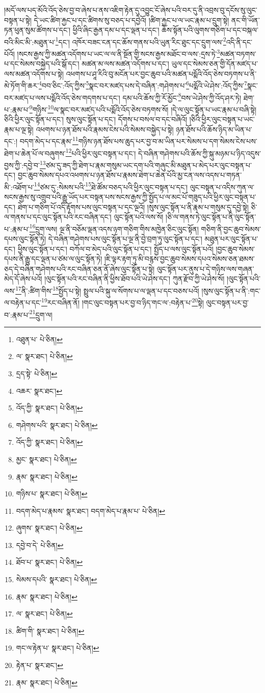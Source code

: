 །མདོ་ལས་པད་མོའི་འོད་ཅེས་བྱ་བ་ཞེས་པ་ནས་འཇིག་རྟེན་དུ་འབྱུང་ངོ་ཞེས་པའི་བར་དུ་ནི་འབྲས་བུ་དངོས་སུ་ལུང་བསྟན་པ་སྟེ། དེ་ཡང་ཚིག་རྐྱང་པ་དང་ཚིགས་སུ་བཅད་པ་དབྱེའོ། །ཚིག་རྐྱང་པ་ལ་ཡང་རྣམ་པ་དྲུག་སྟེ། ནང་གི་ཡོན་ཏན་ཕུན་སུམ་ཚོགས་པ་དང་། ཕྱིའི་ཞིང་རྒྱན་དམ་པ་དང་ལྡན་པ་དང་། ཆོས་སྟོན་པའི་ལུགས་གཅིག་པ་དང་བསྐལ་བའི་མིང་མི་:མཐུན་པ་\footnote{འཐུན་པ་  པེ་ཅིན། }དང་། འཁོར་བཟང་ངན་དང་ཆོས་གནས་པའི་ཡུན་རིང་ཐུང་དང་དྲུག་ལས་\footnote{ལ་  སྣར་ཐང་།  པེ་ཅིན། }འདི་ནི་དང་པོའོ། །སངས་རྒྱས་ཀྱི་མཚན་འདོགས་པ་ཡང་ལ་ལ་ནི་སྔོན་གྱི་སངས་རྒྱས་མཐོང་བ་ལས་:དྲས་ཏེ་\footnote{དྲད་སྟེ་  པེ་ཅིན། }མཚན་བཏགས་པ་དང་སེམས་བསྐྱེད་པའི་སྒོ་དང་། མཚན་མ་ལས་མཚན་འདོགས་པ་དང་། ཡུལ་དང་སེམས་ཅན་གྱི་དོན་མཛད་པ་ལས་མཚན་འདོགས་པ་སྟེ། འཕགས་པ་ཤཱ་རིའི་བུ་མངོན་པར་བྱང་ཆུབ་པའི་མཚན་པདྨོའི་འོད་ཅེས་བཏགས་པ་ནི་མེ་ཏོག་གི་ཆར་\footnote{འཆར་  སྣར་ཐང་། }བབ་ཅིང་:འོད་ཀྱིས་\footnote{འོད་ཀྱི་  སྣར་ཐང་།  པེ་ཅིན། }སྣང་བར་མཛད་པས་དེ་བཞིན་:གཤེགས་པ་\footnote{གཤེགས་པའི་  སྣར་ཐང་།  པེ་ཅིན། }པདྨོའི་ཡེ་ཤེས་:འོད་ཀྱིས་\footnote{འོད་ཀྱི་  སྣར་ཐང་།  པེ་ཅིན། }སྣང་བར་མཛད་པ་ལས་པདྨོའི་འོད་ཅེས་གདགས་པ་དང་། དམ་པའི་ཆོས་ཀྱི་རོ་མྱོང་\footnote{མྱང་  སྣར་ཐང་།  པེ་ཅིན། }བས་ཡེ་ཤེས་ཀྱི་འོད་ཤར་ཏེ། ཐེག་པ་:རྣམ་པ་\footnote{རྣམ་  སྣར་ཐང་།  པེ་ཅིན། }གཉིས་\footnote{གཉིས་པ་  སྣར་ཐང་།  པེ་ཅིན། }ལ་སྣང་བར་མཛད་པའི་པདྨོའི་འོད་ཅེས་བཏགས་སོ། །དེ་ལ་ལུང་སྟོན་པ་ཡང་རྣམ་པ་བཞི་སྟེ། ཅིའི་ཕྱིར་ལུང་སྟོན་པ་དང་། སུས་ལུང་སྟོན་པ་དང་། དོགས་པ་བསལ་བ་དང་བཞིའོ། །ཅིའི་ཕྱིར་ལུང་བསྟན་པ་ཡང་རྣམ་པ་ལྔ་སྟེ། འཕགས་པ་ཉན་ཐོས་པའི་རྣམས་ངེས་པའི་སེམས་བསྐྱེད་པ་སྟེ། ཉན་ཐོས་པའི་ཆོས་ཉིད་མ་ཡིན་པ་དང་:། བདག་མེད་པ་དང་རྣམ་\footnote{བདག་མེད་པ་རྣམས་  སྣར་ཐང་། བདག་མེད་པ་རྣམ་པ་  པེ་ཅིན། }གཉིས་ཉན་ཐོས་པས་ཆུད་པར་བྱ་བ་མ་ཡིན་པར་སེམས་པ་དག་སེམས་ངེས་པས་ཐེག་པ་ཆེན་པོ་ལ་བཞུགས་\footnote{ཞུགས་  སྣར་ཐང་།  པེ་ཅིན། }པའི་ཕྱིར་ལུང་བསྟན་པ་དང་། དེ་བཞིན་གཤེགས་པའི་ཆོས་ཀྱི་སྐུ་མཉམ་པ་ཉིད་འདུས་བྱས་ཀྱི་:དབྱེ་བ་\footnote{དབྱེ་བ་དེ་  པེ་ཅིན། }ཙམ་དུ་ཟད་ཀྱི་ཐེག་པ་རྣམ་གསུམ་ཡང་དག་པའི་གཞུང་མི་མཐུན་པ་མེད་པར་ལུང་བསྟན་པ་དང་། བྱང་ཆུབ་སེམས་དཔའ་འཕགས་པ་ཉན་ཐོས་པ་རྣམས་ཐེག་པ་ཆེན་པོའི་མྱ་ངན་ལས་འདས་པ་གཏན་མི་:འཐོག་པ་\footnote{ཐོབ་པ་  སྣར་ཐང་།  པེ་ཅིན། }ཙམ་དུ་:སེམས་པའི་\footnote{སེམས་དཔའི་  སྣར་ཐང་།  པེ་ཅིན། }ཐེ་ཚོམ་བཅད་པའི་ཕྱིར་ལུང་བསྟན་པ་དང་། ལུང་བསྟན་པ་འདིས་ཀུན་ལ་སངས་རྒྱས་སུ་འགྲུབ་པའི་རྒྱུ་ཡོད་པར་བསྟན་པས་སངས་རྒྱས་ཀྱི་སྤྱོད་པ་ལ་མང་པོ་གཟུད་པའི་ཕྱིར་ལུང་བསྟན་པ་དང་། ཐེག་པ་གཅིག་པོ་འདི་རྟོགས་པས་ལུང་བསྟན་པ་དང་ལྔའོ། །སུས་ལུང་སྟོན་པ་ནི་རྣམ་པ་གསུམ་དུ་དབྱེ་སྟེ། ཅི་ལ་གནས་པ་དང་ལུང་སྟོན་པའི་རང་བཞིན་དང་། ལུང་སྟོན་པའི་ལས་སོ། །ཅི་ལ་གནས་ཏེ་ལུང་སྟོན་པ་ནི་ལུང་སྟོན་པ་:རྣམ་པ་\footnote{རྣམ་  སྣར་ཐང་།  པེ་ཅིན། }དྲུག་ལས། ལྔ་ནི་བཅོམ་ལྡན་འདས་ཉག་གཅིག་གིས་མཁྱེན་ཅིང་ལུང་སྟོན། གཅིག་ནི་བྱང་ཆུབ་སེམས་དཔས་ལུང་སྟོན་ཏེ། དེ་བཞིན་གཤེགས་པས་ལུང་སྟོན་པ་ལྔ་ནི་བྱེ་བྲག་ཏུ་ལུང་སྟོན་པ་དང་། མཐུན་པར་ལུང་སྟོན་པ་དང་། ཕྱིས་ལུང་སྟོན་པ་དང་། བཀོལ་བ་མེད་པའི་ལུང་སྟོན་པ་དང་། སྤྱོད་པ་ལས་ལུང་སྟོན་པའོ། །བྱང་ཆུབ་སེམས་དཔས་ནི་རྒྱུ་དང་ལྡན་པ་ཙམ་ལ་ལུང་སྟོན་ཏེ། །ཇི་ལྟར་རྟག་ཏུ་མི་བརྙས་བྱང་ཆུབ་སེམས་དཔའ་སེམས་ཅན་ཐམས་ཅད་དེ་བཞིན་གཤེགས་པའི་རང་བཞིན་ཅན་ནོ་ཞེས་ལུང་སྟོན་པ་སྟེ། ལུང་སྟོན་པར་ནུས་པ་དེ་གཉིས་ལས་གཞན་མེད་དོ་ཞེས་པའོ། །ལུང་སྟོན་པའི་རང་བཞིན་ནི་ཕྱིས་ཐོབ་པའི་ཡེ་ཤེས་དང་། ཀུན་རྫོབ་ཀྱི་ཡེ་ཤེས་སོ། །ལུང་སྟོན་པའི་ལས་\footnote{ལ་  སྣར་ཐང་།  པེ་ཅིན། }ནི་:ཚིག་གིས་\footnote{ཚིག་གི་  སྣར་ཐང་།  པེ་ཅིན། }སྤྱོད་པ་སྟེ། སྤྲུལ་པའི་སྐུ་ལ་སོགས་པ་ལ་ལྡན་པ་དང་བཅས་པའོ། །སུས་ལུང་སྟོན་པ་ནི་:གང་ལ་བརྟེན་པ་དང་\footnote{གང་ལ་རྟེན་པ་  སྣར་ཐང་།  པེ་ཅིན། }རང་བཞིན་ནོ། །གང་ལུང་བསྟན་པར་བྱ་བ་ཉིད་གང་ལ་:བརྟེན་པ་\footnote{རྟེན་པ་  སྣར་ཐང་། }སྟེ། ལུང་བསྟན་པར་བྱ་བ་:རྣམ་པ་\footnote{རྣམ་  སྣར་ཐང་།  པེ་ཅིན། }དྲུག་ལ། 